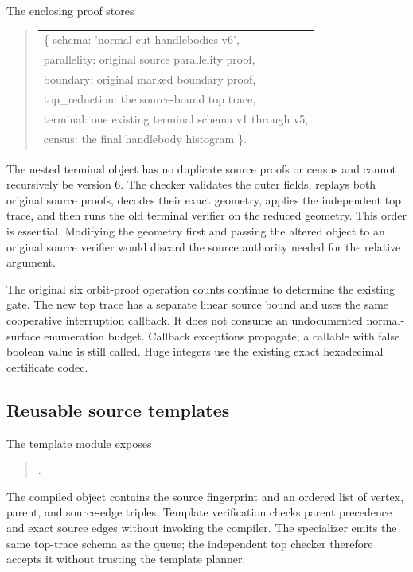 The enclosing proof stores
\begin{quote}\small\ttfamily
\begin{tabular}{@{}l@{}}
\{ schema: 'normal-cut-handlebodies-v6',\\
\quad parallelity: original source parallelity proof,\\
\quad boundary: original marked boundary proof,\\
\quad top\_reduction: the source-bound top trace,\\
\quad terminal: one existing terminal schema v1 through v5,\\
\quad census: the final handlebody histogram \}.
\end{tabular}
\end{quote}
The nested terminal object has no duplicate source proofs or census and
cannot recursively be version 6. The checker validates the outer fields,
replays both original source proofs, decodes their exact geometry, applies
the independent top trace, and then runs the old terminal verifier on the
reduced geometry. This order is essential. Modifying the geometry first and
passing the altered object to an original source verifier would discard the
source authority needed for the relative argument.

The original six orbit-proof operation counts continue to determine the
existing  gate. The new top trace has a separate
linear source bound and uses the same cooperative interruption callback.
It does not consume an undocumented normal-surface enumeration budget.
Callback exceptions propagate; a callable with false boolean value is still
called. Huge integers use the existing exact hexadecimal certificate codec.

\subsection{Reusable source templates}

The template module exposes
\begin{quote}\small
{}\par
{}\par
{}.
\end{quote}
The compiled object contains the source fingerprint and an ordered list of
vertex, parent, and source-edge triples. Template verification checks parent
precedence and exact source edges without invoking the compiler. The
specializer emits the same top-trace schema as the queue; the independent
top checker therefore accepts it without trusting the template planner.

